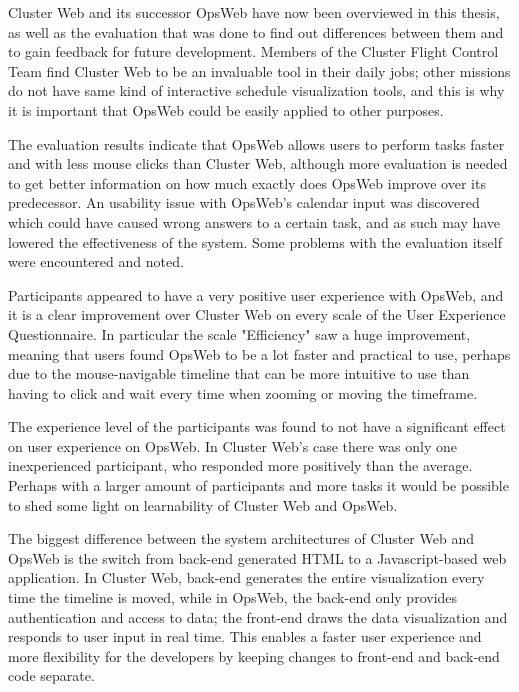 
Cluster Web and its successor OpsWeb have now been overviewed in this thesis, as well as the evaluation that was done to find out differences between them and to gain feedback for future development. Members of the Cluster Flight Control Team find Cluster Web to be an invaluable tool in their daily jobs; other missions do not have same kind of interactive schedule visualization tools, and this is why it is important that OpsWeb could be easily applied to other purposes.

The evaluation results indicate that OpsWeb allows users to perform tasks faster and with less mouse clicks than Cluster Web, although more evaluation is needed to get better information on how much exactly does OpsWeb improve over its predecessor. An usability issue with OpsWeb's calendar input was discovered which could have caused wrong answers to a certain task, and as such may have lowered the effectiveness of the system. Some problems with the evaluation itself were encountered and noted.

Participants appeared to have a very positive user experience with OpsWeb, and it is a clear improvement over Cluster Web on every scale of the User Experience Questionnaire. In particular the scale "Efficiency" saw a huge improvement, meaning that users found OpsWeb to be a lot faster and practical to use, perhaps due to the mouse-navigable timeline that can be more intuitive to use than having to click and wait every time when zooming or moving the timeframe.

The experience level of the participants was found to not have a significant effect on user experience on OpsWeb. In Cluster Web's case there was only one inexperienced participant, who responded more positively than the average. Perhaps with a larger amount of participants and more tasks it would be possible to shed some light on learnability of Cluster Web and OpsWeb.

The biggest difference between the system architectures of Cluster Web and OpsWeb is the switch from back-end generated HTML to a Javascript-based web application. In Cluster Web, back-end generates the entire visualization every time the timeline is moved, while in OpsWeb, the back-end only provides authentication and access to data; the front-end draws the data visualization and responds to user input in real time. This enables a faster user experience and more flexibility for the developers by keeping changes to front-end and back-end code separate.

